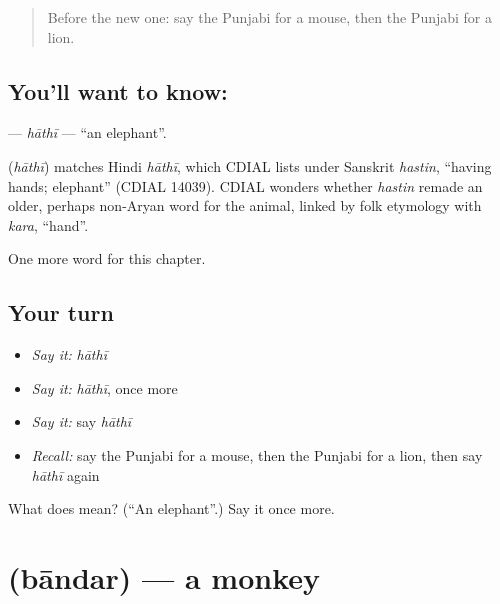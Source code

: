 \label{lesson:PA-C78-hathi}



\begin{quote}
Before the new one: say the Punjabi for a mouse, then the Punjabi for a lion.
\end{quote}

\subsection*{You'll want to know: }
\textbf{} — \emph{hāthī} — \textquotedblleft{}an elephant\textquotedblright{}.

\begin{cousinweb}
\textbf{} (\emph{hāthī}) matches Hindi \emph{hāthī}, which CDIAL lists under Sanskrit \emph{hastin}, \textquotedblleft{}having hands; elephant\textquotedblright{} (CDIAL 14039). CDIAL wonders whether \emph{hastin} remade an older, perhaps non-Aryan word for the animal, linked by folk etymology with \emph{kara}, \textquotedblleft{}hand\textquotedblright{}.
\end{cousinweb}

\begin{grammarlens}[title={What you've built}]
One more word for this chapter.
\end{grammarlens}

\subsection*{Your turn}
\begin{itemize}
\raggedright
  \item \emph{Say it:} \emph{hāthī}
  \item \emph{Say it:} \emph{hāthī}, once more
  \item \emph{Say it:} say \emph{hāthī}
  \item \emph{Recall:} say the Punjabi for a mouse, then the Punjabi for a lion, then say \emph{hāthī} again
\end{itemize}

\begin{tcolorbox}[breakable,colback=teal!4,colframe=teal!35!black,title={Before you move on}]
What does  mean? (\textquotedblleft{}An elephant\textquotedblright{}.) Say it once more.
\end{tcolorbox}
\section[\texorpdfstring{\pa{ਬਾਂਦਰ} (bāndar)}{ਬਾਂਦਰ (bāndar)}]{ (bāndar) — a monkey}

